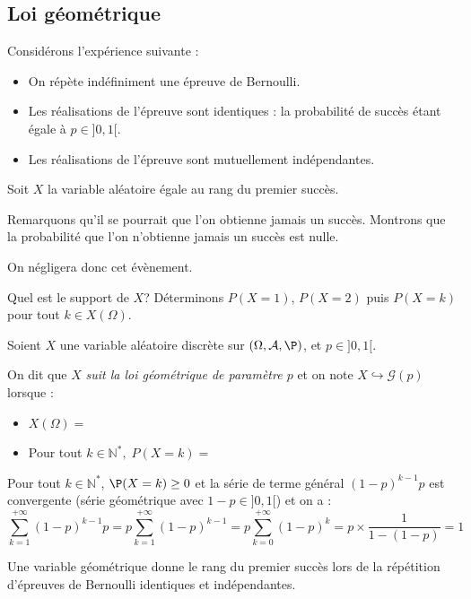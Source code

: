 \documentclass[french,11pt,twoside]{VcCours}
\begin{document}
\subsection{Loi géométrique}
Considérons l'expérience suivante : 

\begin{itemize}
  \item On répète indéfiniment une épreuve de Bernoulli.
  \item Les réalisations de l'épreuve sont identiques : la probabilité de succès étant égale à $p \in ]0,1[$.
  \item Les réalisations de l'épreuve sont mutuellement indépendantes.
 \end{itemize}
 
Soit $X$ la variable aléatoire égale au rang du premier succès. 

\smallskip
Remarquons qu'il se pourrait que l'on obtienne jamais un succès. Montrons que la probabilité que l'on n'obtienne jamais un succès est nulle.

\vspace*{5cm}


On négligera donc cet évènement.
\smallskip

Quel est le support de $X$? Déterminons $P(X=1)$, $P(X=2)$ puis $P(X=k)$ pour tout $k \in X(\Omega)$.

\vspace*{9cm}

\begin{Definition}{}
Soient $X$ une variable aléatoire discrète sur $(\Omega, \mathcal{A},\P)$, et $p \in ]0,1[$. 


On dit que $X$ \emph{suit la loi géométrique de paramètre $p$} et on note $X \hookrightarrow \mathcal{G}(p)$ lorsque :
\begin{itemize}
 \item $X(\Omega)= \phantom{\mathbb{N}^*.}$
 \item Pour tout $k \in \mathbb{N}^*,\;P(X=k)= \phantom{(1-p)^{k-1} p.}$
\end{itemize}
\end{Definition}

Pour tout $k \in \mathbb{N}^*$, $\P(X=k) \geq 0$ et la série de terme général $(1-p)^{k-1} p$ est convergente (série géométrique avec $1-p \in ]0,1[$) et on a :
$$ \sum_{k=1}^{+ \infty} (1-p)^{k-1} p = p \sum_{k=1}^{+ \infty} (1-p)^{k-1} = p \sum_{k=0}^{+ \infty} (1-p)^{k} = p \times \dfrac{1}{1-(1-p)} = 1$$

\begin{Remarque}{} Une variable  géométrique donne le rang du premier succès lors de la répétition d'épreuves de Bernoulli identiques et indépendantes.
\end{Remarque}
\end{document}

